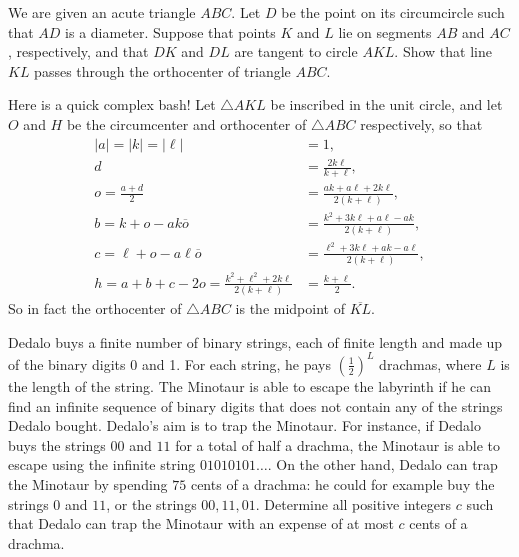 \begin{question}[name={2023 EGMO, \href{https://artofproblemsolving.com/community/c6h3054414p27523016}{Problem 2}}]
	We are given an acute triangle $ABC$. Let $D$ be the point on its circumcircle such that $AD$ is a diameter. Suppose that points $K$ and $L$ lie on segments $AB$ and $AC$, respectively, and that $DK$ and $DL$ are tangent to circle $AKL$.
	Show that line $KL$ passes through the orthocenter of triangle $ABC$.	
\end{question}


\begin{solution}[name={Solution by Matthew Kroesche}]
	Here is a quick complex bash! Let $\triangle AKL$ be inscribed in the unit circle, and let $O$ and $H$ be the circumcenter and orthocenter of $\triangle ABC$ respectively, so that
	\begin{align*}
		|a|=|k|=|\ell|&=1, \\
		d &= \frac{2k\ell}{k+\ell}, \\
		o = \frac{a+d}2 &= \frac{ak+a\ell+2k\ell}{2(k+\ell)}, \\
		b = k + o - ak\overline{o} &= \frac{k^2+3k\ell+a\ell-ak}{2(k+\ell)}, \\
		c = \ell + o - a\ell\overline{o} &= \frac{\ell^2+3k\ell+ak-a\ell}{2(k+\ell)},\\
		h = a+b+c-2o = \frac{k^2+\ell^2+2k\ell}{2(k+\ell)} &= \frac{k+\ell}2.
	\end{align*}So in fact the orthocenter of $\triangle ABC$ is the midpoint of $\overline{KL}$.
\end{solution}



\begin{question}[name={2023 Italy Math Olympiad, \href{https://artofproblemsolving.com/community/c6h3067509p27681162}{Problem 6}}]
	Dedalo buys a finite number of binary strings, each of finite length and made up of the binary digits 0 and 1. For each string, he pays $(\frac{1}{2})^L$ drachmas, where $L$ is the length of the string. The Minotaur is able to escape the labyrinth if he can find an infinite sequence of binary digits that does not contain any of the strings Dedalo bought. Dedalo’s aim is to trap the Minotaur.
	For instance, if Dedalo buys the strings $00$ and $11$ for a total of half a drachma, the Minotaur is able to escape using the infinite string $01010101 \ldots$.
	On the other hand, Dedalo can trap the Minotaur by spending $75$ cents of a drachma: he could for example buy the strings $0$ and $11$, or the strings $00, 11, 01$.
	Determine all positive integers $c$ such that Dedalo can trap the Minotaur with an expense of at most $c$ cents of a drachma.
\end{question}


